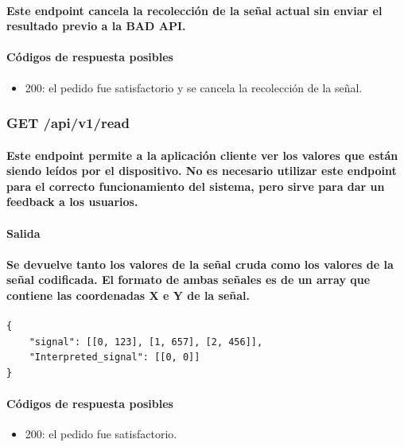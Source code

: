 \documentclass{article}
\begin{document}
\paragraph{
Este endpoint cancela la recolección de la señal actual sin enviar el resultado previo a la BAD API.
}
\paragraph{
Códigos de respuesta posibles
}
\begin{itemize}
    \item 200: el pedido fue satisfactorio y se cancela la recolección de la señal.
\end{itemize}
\subsubsection{GET /api/v1/read}
\paragraph{
Este endpoint permite a la aplicación cliente ver los valores que están siendo leídos por el dispositivo. No es necesario utilizar este endpoint para el correcto funcionamiento del sistema, pero sirve para dar un feedback a los usuarios.
}
\paragraph{
\textbf{Salida}
}
\paragraph{
Se devuelve tanto los valores de la señal cruda como los valores de la señal codificada. El formato de ambas señales es de un array que contiene las coordenadas X e Y de la señal.
}

\begin{verbatim}
{
    "signal": [[0, 123], [1, 657], [2, 456]],
    "Interpreted_signal": [[0, 0]]
}

\end{verbatim}
\paragraph{
Códigos de respuesta posibles
}
\begin{itemize}
    \item 200: el pedido fue satisfactorio.
\end{itemize}
\end{document}
